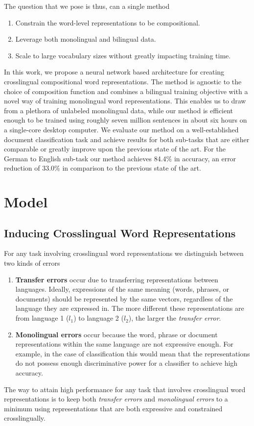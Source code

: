 \documentclass{article} \usepackage{iclr2015,times}
\begin{document}
The question that we pose is thus, can a single method
\begin{enumerate}
    \item{Constrain the word-level representations to be compositional.}
    \item{Leverage both monolingual and bilingual data.}
    \item{Scale to large vocabulary sizes
        without greatly impacting training time.}
\end{enumerate}
In this work, we propose a neural network based architecture for creating
crosslingual compositional word representations.
The method is agnostic to the choice of composition function and combines
a bilingual training objective with a novel way of training monolingual
word representations.
This enables us to draw from a plethora of unlabeled monolingual data,
while our method is efficient enough to be trained using roughly
seven million sentences in about six hours on a single-core desktop computer.
We evaluate our method on a well-established document classification task
and achieve results for both sub-tasks that are either comparable or
greatly improve upon the previous state of the art.
For the German to English sub-task our method achieves 84.4\% in accuracy,
an error reduction of 33.0\% in comparison to the previous state of the art.

\section{Model}

\subsection{Inducing Crosslingual Word Representations}

For any task involving crosslingual word representations we
distinguish between two kinds of errors
\begin{enumerate}
    \item{\textbf{Transfer errors} occur due
        to transferring representations between languages.
        Ideally, expressions of the same meaning
        (words, phrases, or documents) should be represented by the same vectors,
        regardless of the language they are expressed in.
        The more different these representations are
        from language 1 ($l_1$) to language 2 ($l_2$),
        the larger the \emph{transfer error}.}
    \item{\textbf{Monolingual errors} occur because the word,
        phrase or document representations within the same language are not
        expressive enough. For example, in the case of classification this
        would mean that the representations do not possess enough
        discriminative power for a classifier to achieve high accuracy.}
\end{enumerate}
The way to attain high performance for any task that involves crosslingual
word representations is to keep both \emph{transfer errors} and
\emph{monolingual errors} to a minimum using representations that are
both expressive and constrained crosslingually.
\end{document}
